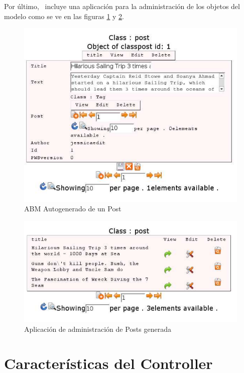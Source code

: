 Por último, \PWB \ incluye una aplicación para la administración de los objetos del modelo como se ve en las figuras \ref{fig-abm1} y \ref{fig-abm2}.

\begin{figure}[h]
	\centering
	\includegraphics[scale=0.5]{images/abm1.pdf}
 	\caption{ABM Autogenerado de un Post}
 	\label{fig-abm1}
\end{figure}

\begin{figure}[h]
	\centering
	\includegraphics[scale=0.5]{images/abm2.pdf}
 	\caption{Aplicación de administración de Posts generada}
 	\label{fig-abm2}
\end{figure}


\section{Características del Controller}
\label{sec-controller}

